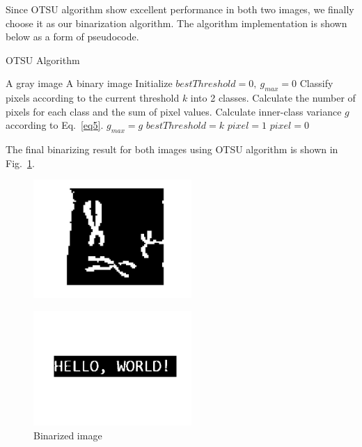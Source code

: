 \documentclass[hyperref]{article}
\theoremstyle{nonumberplain}
\begin{document}
	\hspace{1.0em}
	Since OTSU algorithm show excellent performance in both two images, we finally choose it as our binarization algorithm. The algorithm implementation is shown below as a form of pseudocode.
	
	\begin{algorithm}
		\renewcommand{\algorithmicrequire}{\textbf{Input:}}
		\renewcommand{\algorithmicensure}{\textbf{Output:}}
		\caption{OTSU Algorithm}
		\label{alg1}
		\begin{algorithmic}[1]
			\REQUIRE A gray image
			\ENSURE A binary image
			\STATE Initialize $bestThreshold=0, \ g_{max}=0$
					\STATE Classify pixels according to the current threshold $k$ into 2 classes.
					\STATE Calculate the number of pixels for each class and the sum of pixel values.
					\STATE Calculate inner-class variance $g$ according to Eq.~\ref{eq5}.
						\STATE $g_{max}=g$
						\STATE $bestThreshold = k$
					\ENDIF
				\ENDFOR
			\ENDFOR
					\STATE $pixel=1$
				\ELSE
					\STATE $pixel=0$
				\ENDIF
			\ENDFOR
		\end{algorithmic}  
	\end{algorithm}

	The final binarizing result for both images using OTSU algorithm is shown in Fig.~\ref{fig8}.
	
	\begin{figure}[htbp]
		\centering
		\begin{minipage}[t]{0.48\textwidth}
			\centering
			\includegraphics[width=6cm]{fig8a.jpg}
			\label{fig8a}
		\end{minipage}
		\begin{minipage}[t]{0.48\textwidth}
			\centering
			\includegraphics[width=6cm]{fig8b.jpg}
		\end{minipage}
		\caption{Binarized image}
		\label{fig8}
	\end{figure}
	
\end{document}
